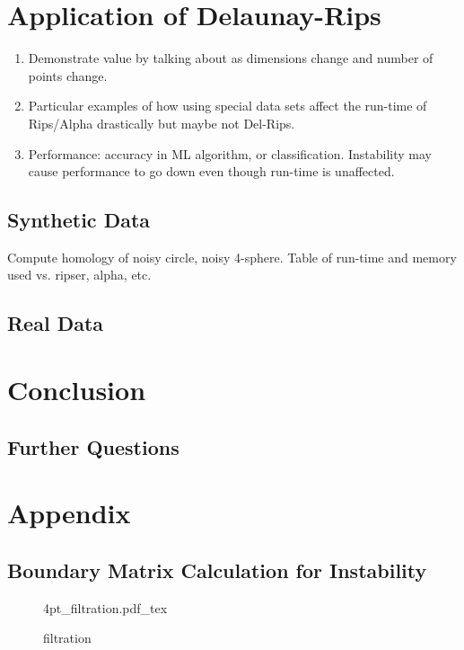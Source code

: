\documentclass[letterpaper,titlepage]{article}
\newcommand{\incfig}[1]{%
    \def\svgwidth{\columnwidth}
    {#1.pdf_tex}
}
\begin{document}
    
\section{Application of Delaunay-Rips}
\begin{enumerate}
    \item Demonstrate value by talking about as dimensions change and number of points change.
    \item Particular examples of how using special data sets affect the run-time of Rips/Alpha drastically but maybe not Del-Rips.
    \item Performance: accuracy in ML algorithm, or classification. Instability may cause performance to go down even though run-time is unaffected.
\end{enumerate}

\subsection{Synthetic Data}
Compute homology of noisy circle, noisy 4-sphere. Table of run-time and memory used vs. ripser, alpha, etc.

\subsection{Real Data}



\section{Conclusion}



\subsection{Further Questions}

\section{Appendix}

\subsection{Boundary Matrix Calculation for Instability}\label{boundary_mat}

\begin{figure}[ht]
    \centering
    \incfig{4pt_filtration}
    \caption{filtration}
    \label{fig:4pt_filtration}
\end{figure}
\end{document}
